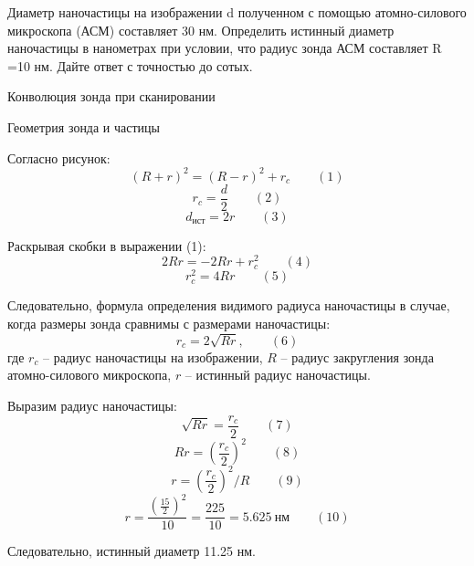
Диаметр наночастицы на изображении d полученном с помощью атомно-силового микроскопа (АСМ) составляет 30 нм. Определить истинный диаметр наночастицы в нанометрах при условии, что радиус зонда АСМ составляет R =10 нм. Дайте ответ с точностью до сотых.


\begin{center}
    Конволюция зонда при сканировании
\end{center}

\explanationSection


\begin{center}
    Геометрия зонда и частицы
\end{center}

Согласно рисунок:
$$(R+r)^2=(R-r)^2+r_c \qquad (1)$$
$$r_c=\frac{d}{2} \qquad  (2)$$
$$d_\text{ист}=2r \qquad  (3)$$

Раскрывая скобки в выражении (1):
$$2Rr=-2Rr+r_c^2 \qquad  (4)$$
$$r_c^2=4Rr  \qquad (5)$$

Следовательно, формула определения видимого радиуса наночастицы в случае, когда размеры зонда сравнимы с размерами наночастицы: 
$$r_c=2 \sqrt{Rr}, \qquad  (6)$$
где $r_c$ – радиус наночастицы на изображении, $R$ – радиус закругления зонда атомно-силового микроскопа, $r$ – истинный радиус наночастицы.

Выразим радиус наночастицы:
$$\sqrt{Rr}=\frac{r_c}{2} \qquad (7)$$
$$Rr=\left(\frac{r_c}{2}\right)^2 \qquad  (8)$$
$$r=\left(\frac{r_c}{2}\right)^2/R \qquad  (9)$$
$$r=\frac{\left(\frac{15}{2}\right)^2}{10}=\frac{225}{10}=5.625 \: \text{нм} \qquad  (10)$$

Следовательно, истинный диаметр 11.25 нм.

